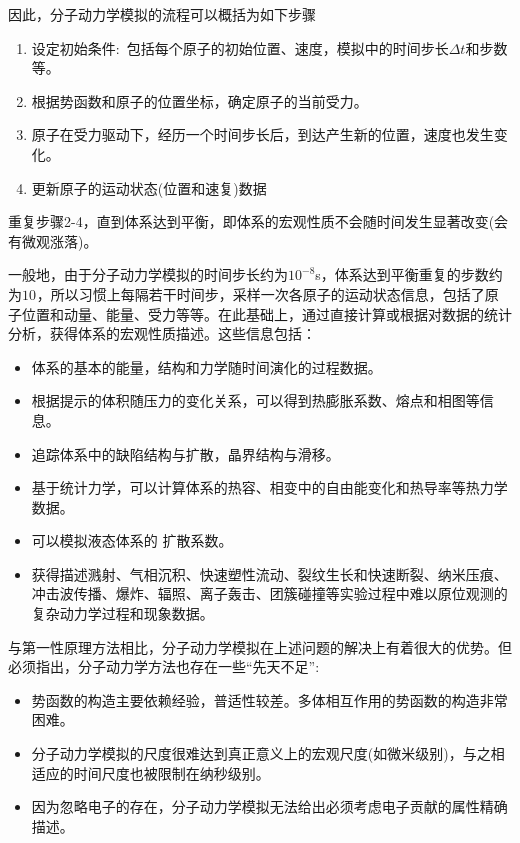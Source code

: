 因此，分子动力学模拟的流程可以概括为如下步骤
\begin{enumerate}
	\item 设定初始条件:~包括每个原子的初始位置、速度，模拟中的时间步长$\Delta t$和步数等。
	\item 根据势函数和原子的位置坐标，确定原子的当前受力。
	\item 原子在受力驱动下，经历一个时间步长后，到达产生新的位置，速度也发生变化。
	\item 更新原子的运动状态(位置和速复)数据
\end{enumerate}
重复步骤\textrm{2-4}，直到体系达到平衡，即体系的宏观性质不会随时间发生显著改变(会有微观涨落)。

一般地，由于分子动力学模拟的时间步长约为\textrm{$10^{-8}$s}，体系达到平衡重复的步数约为$10^{}$，所以习惯上每隔若干时间步，采样一次各原子的运动状态信息，包括了原子位置和动量、能量、受力等等。在此基础上，通过直接计算或根据对数据的统计分析，获得体系的宏观性质描述。这些信息包括：
\begin{itemize}
	\item 体系的基本的能量，结构和力学随时间演化的过程数据。%
	\item 根据提示的体积随压力的变化关系，可以得到热膨胀系数、熔点和相图等信息。
	\item 追踪体系中的缺陷结构与扩散，晶界结构与滑移。
	\item 基于统计力学，可以计算体系的热容、相变中的自由能变化和热导率等热力学数据。
	\item 可以模拟液态体系的%
		扩散系数。
	\item 获得描述溅射、气相沉积、快速塑性流动、裂纹生长和快速断裂、纳米压痕、冲击波传播、爆炸、辐照、离子轰击、团簇碰撞等实验过程中难以原位观测的复杂动力学过程和现象数据。
\end{itemize}

与第一性原理方法相比，分子动力学模拟在上述问题的解决上有着很大的优势。但必须指出，分子动力学方法也存在一些``先天不足'':
\begin{itemize}
	\item 势函数的构造主要依赖经验，普适性较差。多体相互作用的势函数的构造非常困难。
	\item 分子动力学模拟的尺度很难达到真正意义上的宏观尺度(如微米级别)，与之相适应的时间尺度也被限制在纳秒级别。
	\item 因为忽略电子的存在，分子动力学模拟无法给出必须考虑电子贡献的属性精确描述。
\end{itemize}

